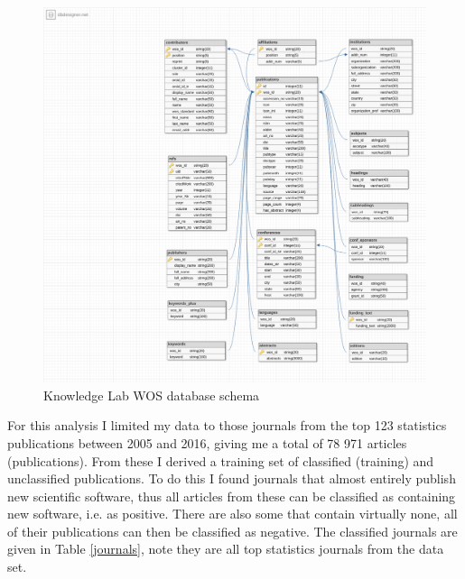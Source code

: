 \documentclass[12pt, a4paper]{article}
\begin{document}
\begin{figure}[!ht]
	\centering
	\includegraphics[width=\textwidth]{wos2_schema}
	\caption{Knowledge Lab WOS database schema}\label{schema}
\end{figure}

For this analysis I limited my data to those journals from the top 123 statistics publications between 2005 and 2016, giving me a total of 78 971 articles (publications). From these I derived a training set of classified (training) and unclassified publications. To do this I found journals that almost entirely publish new scientific software, thus all articles from these can be classified as containing new software, i.e. as positive. There are also some that contain virtually none, all of their publications can then be classified as negative.  The classified journals are given in Table \ref{journals}, note they are all top statistics journals from the data set.
\end{document}
